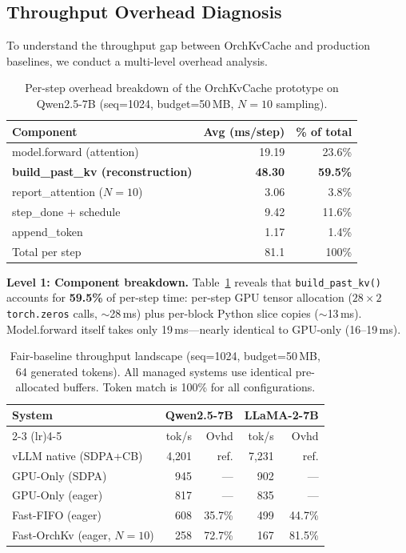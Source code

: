 \documentclass[conference]{IEEEtran}
\begin{document}
\subsection{Throughput Overhead Diagnosis}
\label{sec:overhead}

To understand the throughput gap between OrchKvCache and production baselines, we conduct a multi-level overhead analysis.

\begin{table}[t]
\centering
\caption{Per-step overhead breakdown of the OrchKvCache prototype on Qwen2.5-7B (seq=1024, budget=50\,MB, $N{=}10$ sampling).}
\label{tab:overhead-breakdown}
\small
\setlength{\tabcolsep}{9pt}
\begin{tabular}{@{}lrr@{}}
\toprule
Component & Avg (ms/step) & \% of total \\
\midrule
model.forward (attention) & 19.19 & 23.6\% \\
\textbf{build\_past\_kv (reconstruction)} & \textbf{48.30} & \textbf{59.5\%} \\
report\_attention ($N{=}10$) & 3.06 & 3.8\% \\
step\_done + schedule & 9.42 & 11.6\% \\
append\_token & 1.17 & 1.4\% \\
\midrule
Total per step & 81.1 & 100\% \\
\bottomrule
\end{tabular}
\end{table}

\textbf{Level 1: Component breakdown.} Table~\ref{tab:overhead-breakdown} reveals that \texttt{build\_past\_kv()} accounts for \textbf{59.5\%} of per-step time: per-step GPU tensor allocation ($28{\times}2$ \texttt{torch.zeros} calls, ${\sim}$28\,ms) plus per-block Python slice copies (${\sim}$13\,ms). Model.forward itself takes only 19\,ms---nearly identical to GPU-only (16--19\,ms).

\begin{table}[t]
\centering
\caption{Fair-baseline throughput landscape (seq=1024, budget=50\,MB, 64 generated tokens). All managed systems use identical pre-allocated buffers. Token match is 100\% for all configurations.}
\label{tab:fair-baseline}
\footnotesize
\setlength{\tabcolsep}{9pt}
\begin{tabular}{@{}lrrrr@{}}
\toprule
System & \multicolumn{2}{c}{Qwen2.5-7B} & \multicolumn{2}{c}{LLaMA-2-7B} \\
\cmidrule(lr){2-3} \cmidrule(lr){4-5}
& tok/s & Ovhd & tok/s & Ovhd \\
\midrule
vLLM native (SDPA+CB)        & 4{,}201 & ref.   & 7{,}231 & ref. \\
GPU-Only (SDPA)               & 945     & ---    & 902     & ---  \\
GPU-Only (eager)              & 817     & ---    & 835     & ---  \\
Fast-FIFO (eager)             & 608     & 35.7\% & 499    & 44.7\% \\
Fast-OrchKv (eager, $N{=}10$) & 258     & 72.7\% & 167    & 81.5\% \\
\bottomrule
\end{tabular}
\end{table}
\end{document}
